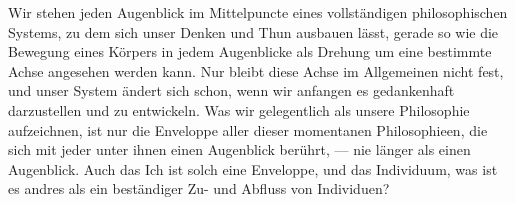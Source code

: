 Wir stehen jeden Augenblick im Mittelpuncte eines vollständigen philosophischen Systems, zu dem sich unser Denken und Thun ausbauen lässt, gerade so wie die Bewegung eines Körpers in jedem Augenblicke als Drehung um eine bestimmte Achse angesehen werden kann. Nur bleibt diese Achse im Allgemeinen nicht fest, und unser System ändert sich schon, wenn wir anfangen es gedankenhaft darzustellen und zu entwickeln. Was wir gelegentlich als unsere Philosophie aufzeichnen, ist nur die Enveloppe aller dieser momentanen Philosophieen, die sich mit jeder unter ihnen einen Augenblick berührt, — nie länger als einen Augenblick. Auch das Ich ist solch eine Enveloppe, und das Individuum, was ist es andres als ein beständiger Zu- und Abfluss von Individuen?
\par

